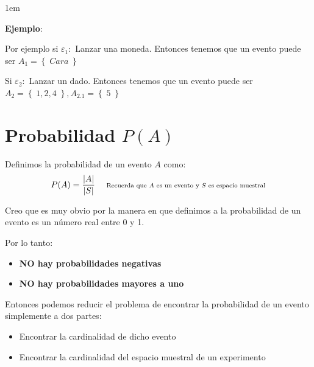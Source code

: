 \documentclass[12pt, fleqn]{report}                             %
\newenvironment{SmallIndentation}[1][0.75em]                    %
        {\begin{adjustwidth}{#1}{}\begin{footnotesize}}             %
        {\end{footnotesize}\end{adjustwidth}}                       %
\DeclareMathOperator \Space     {\quad}                         %
\newcommand \Remember[1]    {\Space\text{\scriptsize{#1}}}      %
\theoremstyle{break}                                            %
\newcommand{\Set}[1]            {\left\{ \; #1 \; \right\}}     %
\begin{document}
                 \begin{SmallIndentation}[1em]
                     \textbf{Ejemplo}:
                     
                    Por ejemplo si $\varepsilon_1:$ Lanzar una moneda.
                    Entonces tenemos que un evento puede ser $A_1 = \Set{Cara}$ 

                    Si $\varepsilon_2:$ Lanzar un dado.
                    Entonces tenemos que un evento puede ser $A_2 = \Set{1, 2, 4}, A_{2.1} = \Set{5}$ 
                 
                 \end{SmallIndentation}




        \clearpage
        \section{Probabilidad $P(A)$}

            Definimos la probabilidad de un evento $A$ como:
            \begin{equation*}
                P(A) = \frac{|A|}{|S|} \Remember{Recuerda que $A$ es un evento y $S$ es espacio muestral}
            \end{equation*}

            Creo que es muy obvio por la manera en que definimos a la probabilidad de un evento
            es un número real entre 0 y 1.

            Por lo tanto:
            \begin{itemize}
                \item \textbf{NO hay probabilidades negativas}
                \item \textbf{NO hay probabilidades mayores a uno}
            \end{itemize}

            Entonces podemos reducir el problema de encontrar la probabilidad de un evento
            simplemente a dos partes:
            \begin{itemize}
                \item Encontrar la cardinalidad de dicho evento
                \item Encontrar la cardinalidad del espacio muestral de un experimento 
            \end{itemize}
\end{document}
